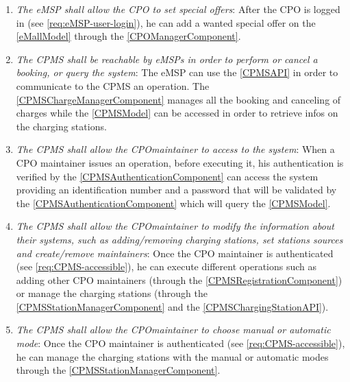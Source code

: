 \begin{enumerate}[label=\textbf{R\arabic*}]
    \label{req:eMSP-set-revenue}
    \item \textit{The \ac{eMSP} shall allow the \ac{CPO} to set special offers}:
    After the \ac{CPO} is logged in (see \ref{req:eMSP-user-login}), he can add a wanted special offer on the \ref{eMallModel} through the \ref{CPOManagerComponent}.
    \label{req:eMSP-set-special-offers}
    \item \textit{The \ac{CPMS} shall be reachable by \acp{eMSP} in order to perform or cancel a booking, or query the system}:
    The \ac{eMSP} can use the \ref{CPMSAPI} in order to communicate to the \ac{CPMS} an operation. The \ref{CPMSChargeManagerComponent} manages all the booking and canceling of charges while the \ref{CPMSModel} can be accessed in order to retrieve infos on the charging stations.
    \label{req:CPMS-reachable}
    \item \textit{The \ac{CPMS} shall allow the \ac{CPO}maintainer to access to the system}:
    When a \ac{CPO} maintainer issues an operation, before executing it, his authentication is verified by the \ref{CPMSAuthenticationComponent} can access the system providing an identification number and a password that will be validated by the \ref{CPMSAuthenticationComponent} which will query the \ref{CPMSModel}.
    \label{req:CPMS-accessible}
    \item \textit{The \ac{CPMS} shall allow the \ac{CPO}maintainer to modify the information about their systems, such as adding/removing charging stations, set stations sources and create/remove maintainers}:
    Once the \ac{CPO} maintainer is authenticated (see \ref{req:CPMS-accessible}), he can execute different operations such as adding other \ac{CPO} maintainers (through the \ref{CPMSRegistrationComponent}) or manage the charging stations (through the \ref{CPMSStationManagerComponent} and the \ref{CPMSChargingStationAPI}).
    \label{req:CPMS-modify-cpo-infos}
    \item \textit{The \ac{CPMS} shall allow the \ac{CPO}maintainer to choose manual or automatic mode}:
    Once the \ac{CPO} maintainer is authenticated (see \ref{req:CPMS-accessible}), he can manage the charging stations with the manual or automatic modes through the \ref{CPMSStationManagerComponent}.
    \label{req:CPMS-select-mode}
\end{enumerate}
\clearpage